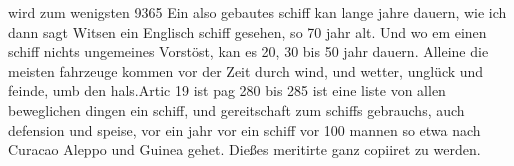 wird zum wenigsten 9365   Ein also gebautes schiff\protect{} kan lange jahre dauern,  wie ich dann sagt Witsen\protect{} ein Englisch schiff\protect{} gesehen, so 70 jahr alt. Und wo em einen schiff\protect{}  nichts ungemeines Vorst\"{o}st, kan es 20, 30 bis 50  jahr dauern. Alleine die meisten fahrzeuge kommen  vor der Zeit durch wind, und wetter, ungl\"{u}ck  und feinde, umb den hals.\pend \pstart  Artic 19 ist pag 280 bis 285 ist eine liste von allen  beweglichen dingen ein schiff\protect{}, und gereitschaft zum  schiffs gebrauchs, auch defension und speise, vor ein jahr  vor ein schiff\protect{} vor 100 mannen so etwa nach Curacao\protect{} Aleppo\protect{} und Guinea\protect{} gehet. Dießes meritirte ganz copiiret  zu werden.\pend \pstart 